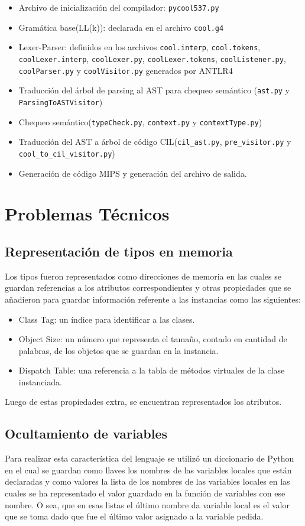 \documentclass[]{article}
\begin{document}
\begin{itemize}
	\item Archivo de inicialización del compilador: \verb|pycool537.py|
	\item Gramática base(LL(k)): declarada en el archivo \verb|cool.g4|
	\item Lexer-Parser: definidos en los archivos \verb|cool.interp|, \verb|cool.tokens|, \verb|coolLexer.interp|, \verb|coolLexer.py|, \verb|coolLexer.tokens|, \verb|coolListener.py|, \verb|coolParser.py| y \verb|coolVisitor.py| generados por ANTLR4
	\item Traducción del árbol de parsing al AST para chequeo semántico (\verb|ast.py| y \verb|ParsingToASTVisitor|)
	\item Chequeo semántico(\verb|typeCheck.py|, \verb|context.py| y \verb|contextType.py|)
	\item Traducción del AST a árbol de código CIL(\verb|cil_ast.py|, \verb|pre_visitor.py| y \verb|cool_to_cil_visitor.py|)
	\item Generación de código MIPS y generación del archivo de salida.
\end{itemize}

\section{Problemas Técnicos}
\subsection{Representación de tipos en memoria}
Los tipos fueron representados como direcciones de memoria en las cuales se guardan referencias a los atributos correspondientes y otras propiedades que se añadieron para guardar información referente a las instancias como las siguientes:
\begin{itemize}
	\item Class Tag: un índice para identificar a las clases.
	\item Object Size: un número que representa el tamaño, contado en cantidad de palabras, de los objetos que se guardan en la instancia.
	\item Dispatch Table: una referencia a la tabla de métodos virtuales de la clase instanciada.
\end{itemize}

Luego de estas propiedades extra, se encuentran representados los atributos.

\subsection{Ocultamiento de variables}
Para realizar esta característica del lenguaje se utilizó un diccionario de Python en el cual se guardan como llaves los nombres de las variables locales que están declaradas y como valores la lista de los nombres de las variables locales en las cuales se ha representado el valor guardado en la función de variables con ese nombre. O sea, que en esas listas el último nombre da variable local es el valor que se toma dado que fue el último valor asignado a la variable pedida.
\end{document}
